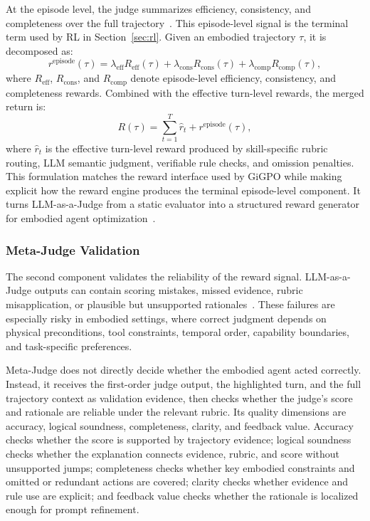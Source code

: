 At the episode level, the judge summarizes efficiency, consistency, and completeness over the full trajectory~\citep{han2026swetrace}. This episode-level signal is the terminal term used by RL in Section~\ref{sec:rl}. Given an embodied trajectory $\tau$, it is decomposed as:
\begin{equation}
r^{\mathrm{episode}}(\tau)
=
\lambda_{\mathrm{eff}} R_{\mathrm{eff}}(\tau)
+ \lambda_{\mathrm{cons}} R_{\mathrm{cons}}(\tau)
+ \lambda_{\mathrm{comp}} R_{\mathrm{comp}}(\tau),
\label{eq:episode_reward}
\end{equation}
where $R_{\mathrm{eff}}$, $R_{\mathrm{cons}}$, and $R_{\mathrm{comp}}$ denote episode-level efficiency, consistency, and completeness rewards. Combined with the effective turn-level rewards, the merged return is:
\begin{equation}
R(\tau)=
\sum_{t=1}^{T}\hat{r}_{t}
+
r^{\mathrm{episode}}(\tau),
\label{eq:multi_tier_reward}
\end{equation}
where $\hat{r}_{t}$ is the effective turn-level reward produced by skill-specific rubric routing, LLM semantic judgment, verifiable rule checks, and omission penalties. This formulation matches the reward interface used by GiGPO while making explicit how the reward engine produces the terminal episode-level component. It turns LLM-as-a-Judge from a static evaluator into a structured reward generator for embodied agent optimization~\citep{zheng2023judging}.

\subsubsection{Meta-Judge Validation}
\label{subsec:meta_judge_validation}

The second component validates the reliability of the reward signal. LLM-as-a-Judge outputs can contain scoring mistakes, missed evidence, rubric misapplication, or plausible but unsupported rationales~\citep{silva2026metajudging}. These failures are especially risky in embodied settings, where correct judgment depends on physical preconditions, tool constraints, temporal order, capability boundaries, and task-specific preferences.

Meta-Judge does not directly decide whether the embodied agent acted correctly. Instead, it receives the first-order judge output, the highlighted turn, and the full trajectory context as validation evidence, then checks whether the judge's score and rationale are reliable under the relevant rubric. Its quality dimensions are accuracy, logical soundness, completeness, clarity, and feedback value. Accuracy checks whether the score is supported by trajectory evidence; logical soundness checks whether the explanation connects evidence, rubric, and score without unsupported jumps; completeness checks whether key embodied constraints and omitted or redundant actions are covered; clarity checks whether evidence and rule use are explicit; and feedback value checks whether the rationale is localized enough for prompt refinement.

